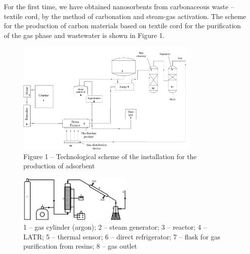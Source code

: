 \begin{multicols}{2}
For the first time, we have obtained nanosorbents from carbonaceous
waste -- textile cord, by the method of carbonation and steam-gas
activation. The scheme for the production of carbon materials based on
textile cord for the purification of the gas phase and wastewater is
shown in Figure 1.
\end{multicols}

\begin{figure}[H]
	\centering
	\includegraphics[width=0.8\textwidth]{assets/1004}
	\caption*{Figure 1 -- Technological scheme of the installation for the production of adsorbent}
\end{figure}

\begin{figure}[H]
	\centering
	\includegraphics[width=0.5\textwidth]{assets/1005}
	\caption*{Figure 2 -- Schematic diagram of a laboratory installation of steam and gas activation:}
	\caption*{1 -- gas cylinder (argon); 2 -- steam generator; 3 -- reactor; 4 -- LATR; 5 -- thermal sensor; 6 -- direct refrigerator; 7 -- flask for gas purification from resins; 8 -- gas outlet}
\end{figure}

